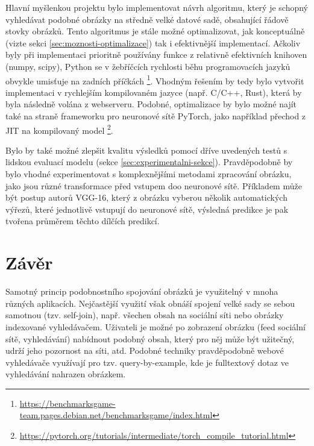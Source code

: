 \documentclass[12pt]{article}
\begin{document}

Hlavní myšlenkou projektu bylo implementovat návrh algoritmu, který je schopný vyhledávat podobné obrázky na středně velké datové sadě, obsahující řádově stovky obrázků.
Tento algoritmus je stále možné optimalizovat, jak konceptuálně (vizte sekci \ref{sec:moznosti-optimalizace}) tak i efektivnější implementací.
Ačkoliv byly při implementaci prioritně používány funkce z relativně efektivních knihoven (numpy, scipy), Python se v žebříčcích rychlosti běhu programovacích jazyků obvykle umisťuje na zadních příčkách%
\footnote{\url{https://benchmarksgame-team.pages.debian.net/benchmarksgame/index.html}}.
Vhodným řešením by tedy bylo vytvořit implementaci v rychlejším kompilovaném jazyce (např. C/C++, Rust), která by byla následně volána z webserveru.
Podobné, optimalizace by bylo možné najít také na straně frameworku pro neuronové sítě PyTorch, jako například přechod z JIT na kompilovaný model%
\footnote{\url{https://pytorch.org/tutorials/intermediate/torch_compile_tutorial.html}}.

Bylo by také možné zlepšit kvalitu výsledků pomocí dříve uvedených testů s lidskou evaluací modelu (sekce \ref{sec:experimentalni-sekce}).
Pravděpodobně by bylo vhodné experimentovat s komplexnějšími metodami zpracování obrázku, jako jsou různé transformace před vstupem doo neuronové sítě.
Příkladem může být postup autorů VGG-16, který z obrázku vyberou několik automatických výřezů, které jednotlivě vstupují do neuronové sítě, výsledná predikce je pak tvořena průměrem těchto dílčích predikcí.

\section{Závěr}


Samotný princip podobnostního spojování obrázků je využitelný v mnoha různých aplikacích.
Nejčastější využití však obnáší spojení velké sady se sebou samotnou (tzv. self-join), např. všechen obsah na sociální síti nebo obrázky indexované vyhledávačem.
Uživateli je možné po zobrazení obrázku (feed sociální sítě, vyhledávání) nabídnout podobný obsah, který pro něj může být užitečný, udrží jeho pozornost na síti, atd.
Podobné techniky pravděpodobně webové vyhledávače využívají pro tzv. query-by-example, kde je fulltextový dotaz ve vyhledávání nahrazen obrázkem.
\end{document}
